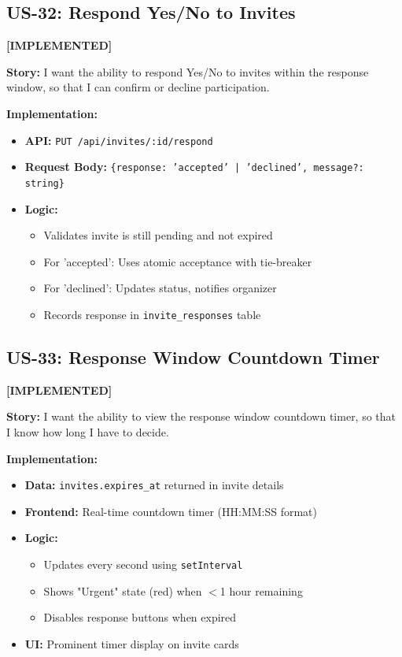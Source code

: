 \documentclass[11pt,a4paper]{article}
\newcommand{\implemented}{\textcolor{implemented}{\textbf{[IMPLEMENTED]}}}
\begin{document}
\subsection{US-32: Respond Yes/No to Invites}
\implemented

\textbf{Story:} I want the ability to respond Yes/No to invites within the response window, so that I can confirm or decline participation.

\textbf{Implementation:}
\begin{itemize}[leftmargin=*]
  \item \textbf{API:} \texttt{PUT /api/invites/:id/respond}
  \item \textbf{Request Body:} \texttt{\{response: 'accepted' | 'declined', message?: string\}}
  \item \textbf{Logic:}
    \begin{itemize}
      \item Validates invite is still pending and not expired
      \item For 'accepted': Uses atomic acceptance with tie-breaker
      \item For 'declined': Updates status, notifies organizer
      \item Records response in \texttt{invite\_responses} table
    \end{itemize}
\end{itemize}

\subsection{US-33: Response Window Countdown Timer}
\implemented

\textbf{Story:} I want the ability to view the response window countdown timer, so that I know how long I have to decide.

\textbf{Implementation:}
\begin{itemize}[leftmargin=*]
  \item \textbf{Data:} \texttt{invites.expires\_at} returned in invite details
  \item \textbf{Frontend:} Real-time countdown timer (HH:MM:SS format)
  \item \textbf{Logic:}
    \begin{itemize}
      \item Updates every second using \texttt{setInterval}
      \item Shows "Urgent" state (red) when $<$1 hour remaining
      \item Disables response buttons when expired
    \end{itemize}
  \item \textbf{UI:} Prominent timer display on invite cards
\end{itemize}
\end{document}
